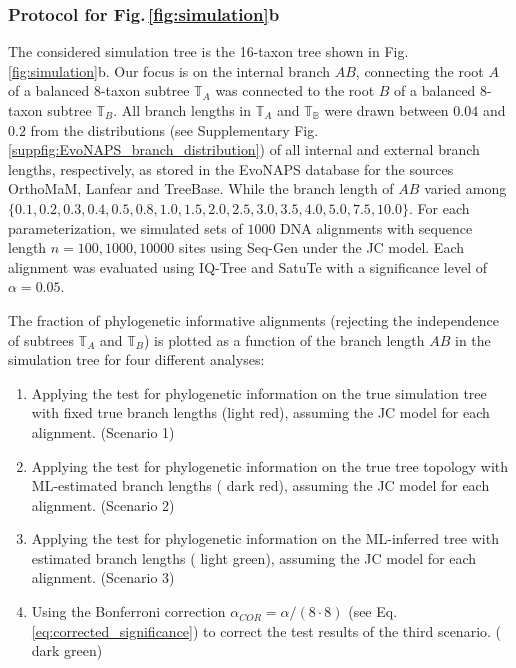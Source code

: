\subsubsection*{Protocol for Fig.\,\ref{fig:simulation}b}\label{sec:protocol_simulation_16taxa}
The considered simulation tree is the 16-taxon tree shown in Fig.\,\ref{fig:simulation}b. Our focus is on the internal branch $AB$, connecting the root $A$ of a balanced $8$-taxon subtree $\mathbb{T}_A$ was connected to the root $B$ of a balanced $8$-taxon subtree $\mathbb{T}_B$. All branch lengths in $\mathbb{T}_A$ and $\mathbb{T_B}$ were drawn between $0.04$ and $0.2$ from the distributions (see Supplementary Fig.\,\ref{suppfig:EvoNAPS_branch_distribution}) of all internal and external branch lengths, respectively, as stored in the EvoNAPS database  for the sources OrthoMaM, Lanfear and TreeBase. While the branch length of $AB$ varied among $\{0.1, 0.2, 0.3, 0.4, 0.5, 0.8, 1.0, 1.5, 2.0, 2.5, 3.0, 3.5, 4.0, 5.0, 7.5, 10.0\}$. For each parameterization, we simulated sets of $1000$ DNA alignments with sequence length ${n = 100, 1000, 10000}$ sites using Seq-Gen  under the JC model. Each alignment was evaluated using IQ-Tree  and SatuTe with a significance level of $\alpha = 0.05$.

\medskip
The fraction of phylogenetic informative alignments (rejecting the independence of subtrees $\mathbb{T}_A$ and $\mathbb{T}_B$) is plotted as a function of the branch length $AB$ in the simulation tree for four different analyses:

\medskip

\begin{enumerate}
\item Applying the test for phylogenetic information on the true simulation tree with fixed true branch lengths ({\color{truetree}light red}), assuming the JC model for each alignment. (Scenario 1)
\item Applying the test for phylogenetic information on the true tree topology with ML-estimated branch lengths ({\color{truetreeML} dark red}), assuming the JC model for each alignment. (Scenario 2)
\item Applying the test for phylogenetic information on the ML-inferred tree with estimated branch lengths ({\color{MLtree} light green}), assuming the JC model for each alignment. (Scenario 3) 
\item Using the  Bonferroni correction $\alpha_{COR} = \alpha/(8\cdot8)$ (see Eq.\,\eqref{eq:corrected_significance}) to correct the test results of the third scenario. ({\color{MLtreeBonferroni} dark green})
\end{enumerate}

